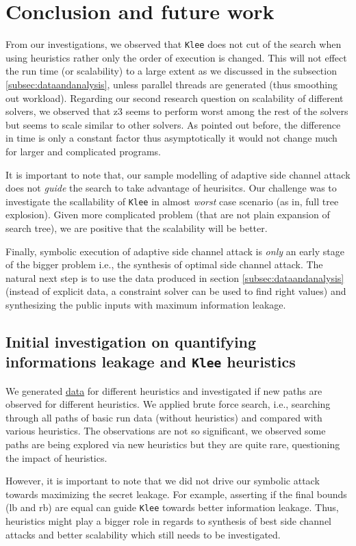 \documentclass[11pt,a4paper,notitlepage]{article}
\begin{document}
\section{Conclusion and future work}
\label{sec:futurework}

From our investigations, we observed that \texttt{Klee} does not cut of the search when using heuristics rather only the order of execution is changed.
This will not effect the run time (or scalability) to a large extent as we discussed in the subsection \ref{subsec:dataandanalysis}, unless parallel threads are generated (thus smoothing out workload).
Regarding our second research question on scalability of different solvers, we observed that z3 seems to perform worst among the rest of the solvers but seems to scale similar to other solvers.
As pointed out before, the difference in time is only a constant factor thus asymptotically it would not change much for larger and complicated programs.

It is important to note that, our sample modelling of adaptive side channel attack does not \emph{guide} the search to take advantage of heurisitcs.
Our challenge was to investigate the scallability of \texttt{Klee} in almost \emph{worst} case scenario (as in, full tree explosion).
Given more complicated problem (that are not plain expansion of search tree), we are positive that the scalability will be better.

Finally, symbolic execution of adaptive side channel attack is \emph{only} an early stage of the bigger problem i.e., the synthesis of optimal side channel attack.
The natural next step is to use the data produced in section \ref{subsec:dataandanalysis} (instead of explicit data, a constraint solver can be used to find right values) and synthesizing the public inputs with maximum information leakage.


\subsection{Initial investigation on quantifying informations leakage and \texttt{Klee} heuristics}
\label{subsec:initialinvestigationleakage}

We generated \href{https://github.com/irfansha/LBS_projects/blob/master/final_project/data/explicit_data.zip}{data} for different heuristics and investigated if new paths are observed for different heuristics.
We applied brute force search, i.e., searching through all paths of basic run data (without heuristics) and compared with various heuristics.
The observations are not so significant, we observed some paths are being explored via new heuristics but they are quite rare, questioning the impact of heuristics.

However, it is important to note that we did not drive our symbolic attack towards maximizing the secret leakage.
For example, asserting if the final bounds (lb and rb) are equal can guide \texttt{Klee} towards better information leakage.
Thus, heuristics might play a bigger role in regards to synthesis of best side channel attacks and better scalability which still needs to be investigated.




\end{document}
